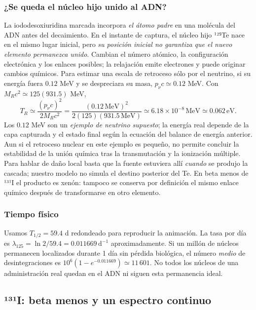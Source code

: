 \documentclass[11pt,a4paper,oneside]{article}
\begin{document}
\subsubsection{¿Se queda el núcleo hijo unido al ADN?}\label{se-queda-el-nuxfacleo-hijo-unido-al-adn}

La iododesoxiuridina marcada incorpora \emph{el átomo padre} en una molécula del ADN antes del decaimiento. En el instante de captura, el núcleo hijo ¹²⁵Te nace en el mismo lugar inicial, pero \emph{su posición inicial no garantiza que el nuevo elemento permanezca unido}. Cambian el número atómico, la configuración electrónica y los enlaces posibles; la relajación emite electrones y puede originar cambios químicos. Para estimar una escala de retroceso sólo por el neutrino, si su energía fuera \(0.12\) MeV y se despreciara su masa, \(p_\nu c\simeq0.12\) MeV. Con \(M_Rc^2\simeq125(931.5)\) MeV, \[T_R\simeq\frac{(p_\nu c)^2}{2M_Rc^2}=\frac{(0.12\,\mathrm{MeV})^2}{2(125)(931.5\,\mathrm{MeV})}\simeq6.18\times10^{-8}\,\mathrm{MeV}\simeq0.062\,\mathrm{eV}.\] Los \(0.12\) MeV son un \emph{ejemplo de neutrino supuesto}; la energía real depende de la capa capturada y el estado final según la ecuación del balance de energía anterior. Aun si el retroceso nuclear en este ejemplo es pequeño, no permite concluir la estabilidad de la unión química tras la transmutación y la ionización múltiple. Para hablar de daño local basta que la fuente estuviera allí \emph{cuando} se produjo la cascada; nuestro modelo no simula el destino posterior del Te. En beta menos de ¹³¹I el producto es xenón: tampoco se conserva por definición el mismo enlace químico después de transformarse en otro elemento.

\subsubsection{Tiempo físico}\label{tiempo-fuxedsico}

Usamos \(T_{1/2}=59.4\) d redondeado para reproducir la animación. La tasa por día es \(\lambda_{125}=\ln2/59.4=0.011669\,\mathrm{d}^{-1}\) aproximadamente. Si un millón de núcleos permanecen localizados durante 1 día sin pérdida biológica, el número \emph{medio} de desintegraciones es \(10^6(1-e^{-0.011669})\simeq11\,601\). No todos los núcleos de una administración real quedan en el ADN ni siguen esta permanencia ideal.

\subsection{¹³¹I: beta menos y un espectro continuo}\label{i-beta-menos-y-un-espectro-continuo}
\end{document}
